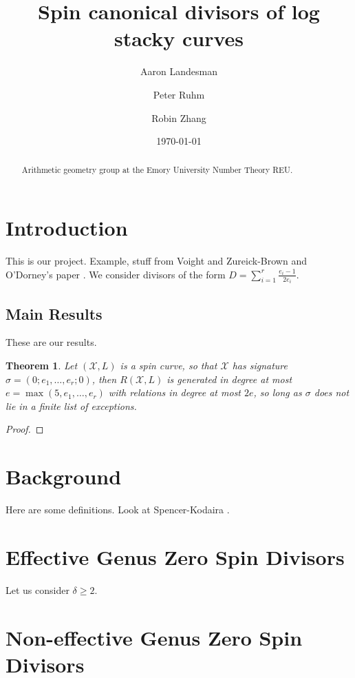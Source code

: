 \documentclass{amsart}
\title{Spin canonical divisors of log stacky curves}
\author{Aaron Landesman}
\author{Peter Ruhm}
\author{Robin Zhang}
\date{\today}
\theoremstyle{plain}
\newtheorem{thm}{Theorem}[section]
\theoremstyle{definition}
\theoremstyle{remark}
\numberwithin{equation}{section}
\newcommand \sx{\mathscr X}
\newcommand \halfcan{L}
\newcommand \subhalf[1]{\frac{e_{#1} - 1}{2e_{#1}}}
\begin{document}
\begin{abstract}
  Arithmetic geometry group at the Emory University Number Theory
	REU.
\end{abstract}

\maketitle

\tableofcontents

\section{Introduction}
This is our project.
Example, stuff from Voight and Zureick-Brown \cite{vzb:stacky}
and O'Dorney's paper \cite{dorney:canonical}.
We consider divisors of the form $D = \sum_{i = 1}^{r} \subhalf{i}$.

\subsection{Main Results}
These are our results.
\begin{thm}
\label{thm:g_0_generators_relations}
Let $(\sx,\halfcan)$ is a spin curve, so that $\sx$ has signature
$\sigma = (0;e_1,\ldots, e_r;0)$, then $R(\sx,\halfcan)$ is
generated in degree at most $e = \max(5,e_1,\ldots, e_r)$ with
relations in degree at most $2e$, so long as $\sigma$ does not lie
in a finite list of exceptions. 
\end{thm}

\begin{proof}

\end{proof}


\section{Background}
Here are some definitions.
Look at Spencer-Kodaira \cite{kodaira:complex-manifolds}.


\section{Effective Genus Zero Spin Divisors}
\label{sec:g_0_effective}
Let us consider $\delta \geq 2$. 


\section{Non-effective Genus Zero Spin Divisors}
\label{sec:g_0_non_effective}
\end{document}
